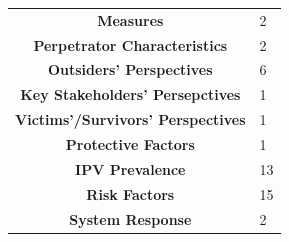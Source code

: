 \documentclass[]{tufte-handout}
\begin{document}
\begin{longtable}[]{@{}cl@{}}
\begin{minipage}[t]{0.54\columnwidth}\centering\strut
\textbf{Measures}\strut
\end{minipage} & \begin{minipage}[t]{0.16\columnwidth}\raggedright\strut
2\strut
\end{minipage}\tabularnewline
\begin{minipage}[t]{0.54\columnwidth}\centering\strut
\textbf{Perpetrator Characteristics}\strut
\end{minipage} & \begin{minipage}[t]{0.16\columnwidth}\raggedright\strut
2\strut
\end{minipage}\tabularnewline
\begin{minipage}[t]{0.54\columnwidth}\centering\strut
\textbf{Outsiders' Perspectives}\strut
\end{minipage} & \begin{minipage}[t]{0.16\columnwidth}\raggedright\strut
6\strut
\end{minipage}\tabularnewline
\begin{minipage}[t]{0.54\columnwidth}\centering\strut
\textbf{Key Stakeholders' Persepctives}\strut
\end{minipage} & \begin{minipage}[t]{0.16\columnwidth}\raggedright\strut
1\strut
\end{minipage}\tabularnewline
\begin{minipage}[t]{0.54\columnwidth}\centering\strut
\textbf{Victims'/Survivors' Perspectives}\strut
\end{minipage} & \begin{minipage}[t]{0.16\columnwidth}\raggedright\strut
1\strut
\end{minipage}\tabularnewline
\begin{minipage}[t]{0.54\columnwidth}\centering\strut
\textbf{Protective Factors}\strut
\end{minipage} & \begin{minipage}[t]{0.16\columnwidth}\raggedright\strut
1\strut
\end{minipage}\tabularnewline
\begin{minipage}[t]{0.54\columnwidth}\centering\strut
\textbf{IPV Prevalence}\strut
\end{minipage} & \begin{minipage}[t]{0.16\columnwidth}\raggedright\strut
13\strut
\end{minipage}\tabularnewline
\begin{minipage}[t]{0.54\columnwidth}\centering\strut
\textbf{Risk Factors}\strut
\end{minipage} & \begin{minipage}[t]{0.16\columnwidth}\raggedright\strut
15\strut
\end{minipage}\tabularnewline
\begin{minipage}[t]{0.54\columnwidth}\centering\strut
\textbf{System Response}\strut
\end{minipage} & \begin{minipage}[t]{0.16\columnwidth}\raggedright\strut
2\strut
\end{minipage}\tabularnewline
\bottomrule
\end{longtable}
\end{document}

